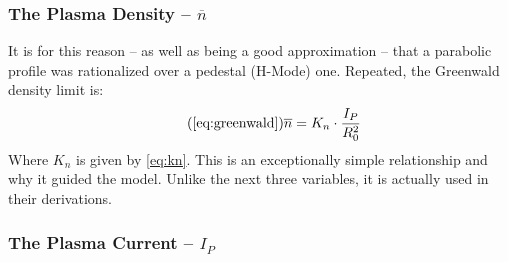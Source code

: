 \subsubsection{The Plasma Density -- $\overline n$}

 It is for this reason -- as well as being a good approximation -- that a parabolic profile was rationalized over a pedestal (H-Mode) one. Repeated, the Greenwald density limit is:
\begin{equation}
	\tag{\ref{eq:greenwald}}
	\overline n = K_n \cdot \frac{I_P}{R_0^2}
\end{equation}
Where $K_n$ is given by \cref{eq:kn}. This is an exceptionally simple relationship and why it guided the model. Unlike the next three variables, it is actually used in their derivations. 

\subsubsection{The Plasma Current -- $I_P$}

